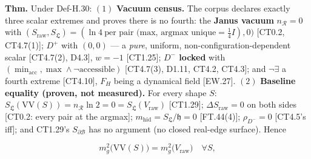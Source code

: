 \begin{theorem}\label{tag:FT-85}
\textbf{Thm.} Under Def-H.30: $(1)$ \textbf{Vacuum census.} The corpus declares exactly three scalar extremes and proves there is no fourth: the \textbf{Janus vacuum} $n_{\mathcal R}=0$ with $(S_{\mathrm{raw}},S_{\mathfrak L})=(\ln4\ \text{per pair (max, argmax unique}=\tfrac14I),0)$ [CT0.2, CT4.7(1)]; \textbf{$D^+$} with $(0,0)$ — a \textit{pure}, uniform, non-configuration-dependent scalar [CT4.7(2), D4.3], $w=-1$ [CT1.25]; \textbf{$D^-$ locked} with $(\min_{\mathrm{acc}},\max\wedge\neg\text{accessible})$ [CT4.7(3), D1.11, CT4.2, CT4.3]; and $\neg\exists$ a fourth extreme [CT4.10], $F_H$ being a dynamical field [EW.27]. $(2)$ \textbf{Baseline equality (proven, not measured).} For every shape $S$: $S_{\mathfrak L}(\mathrm{VV}(S))=n_{\mathcal R}\ln2=0=S_{\mathfrak L}(V_{\mathrm{raw}})$ [CT1.29]; $\Delta S_{\mathrm{raw}}=0$ on both sides [CT0.2: every pair at the argmax]; $m_{\mathrm{hid}}=S_{\mathfrak L}/\mathfrak h=0$ [FT.44(4)]; $\rho_{D^-}=0$ [CT4.5's iff]; and CT1.29's $S_{\partial\mathcal B}$ has no argument (no closed real-edge surface). Hence

\[
m_g^2\bigl(\mathrm{VV}(S)\bigr)=m_g^2\bigl(V_{\mathrm{raw}}\bigr)\quad\forall S,
\]


\end{theorem}
